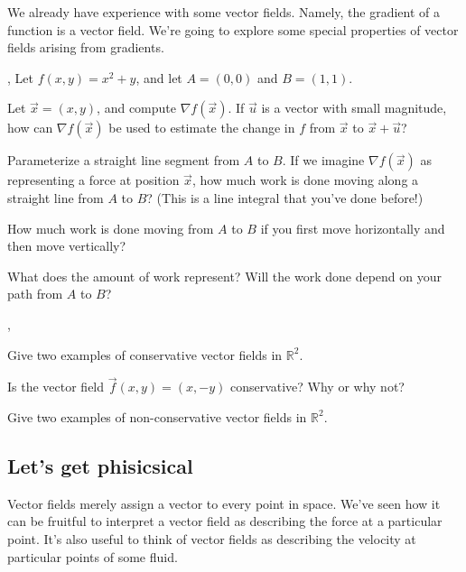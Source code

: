 \documentclass[letter]{article}
\newcommand{\R}{\mathbb{R}}
\newcommand{\sepl}{\sep \vspace{-.35in}}
\renewcommand{\emph}[1]{{\color{defcolor} \textbf{\textit{##1}}}}
\begin{document}
	We already have experience with some vector fields.  Namely, the gradient of a function is a vector field.
	We're going to explore some special properties of vector fields arising from gradients.
	
	\sep
	Let $f(x,y) = x^2+y$, and let $A=(0,0)$ and $B=(1,1)$.
	\begin{Enum}
		\item Let $\vec x=(x,y)$, and compute $\nabla f(\vec x)$.   
			If $\vec u$ is a vector with small
			magnitude, how can $\nabla f(\vec x)$ be used to
			estimate the change in $f$ from $\vec x$ to $\vec x+\vec u$?
		\item Parameterize a straight line segment from $A$ to $B$.  If we imagine
			$\nabla f(\vec x)$ as representing a force at position $\vec x$,
			how much work is done moving along a straight line
			from $A$ to $B$?  (This is a line integral that you've done
			before!)
		\item How much work is done moving from $A$ to $B$ if you first move
			horizontally and then move vertically?
		\item What does the amount of work represent?  Will the work done
			depend on your path from $A$ to $B$?

	\end{Enum}

	\vspace{-.7cm}

	\sepl
	\begin{Enum}
		\item Give two examples of conservative vector fields in $\R^2$.
		\item Is the vector field $\vec f(x,y) = (x,-y)$ conservative?
			Why or why not?
		\item Give two examples of non-conservative vector fields in $\R^2$.
	\end{Enum}

\subsection*{Let's get phisicsical}
	Vector fields merely assign a vector to every point in space.  We've
	seen how it can be fruitful to interpret a vector field as describing
	the force at a particular point.  It's also useful to think of vector
	fields as describing the velocity at particular points of some fluid.
\end{document}
